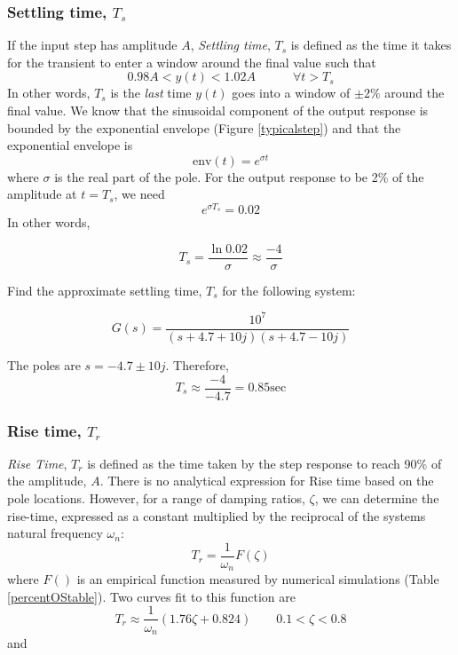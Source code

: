 \subsubsection{Settling time, $T_s$}
If the input step has amplitude $A$,
{\it Settling time}, $T_s$ is defined as the time it takes for the transient to enter a window around the final value such that
\[
0.98A < y(t) < 1.02A   \qquad\quad \forall t > T_s
\]
In other words, $T_s$ is the {\it last} time $y(t)$ goes into a window of $\pm2\%$ around the final value.
We know that the sinusoidal component of the output response is bounded by the exponential envelope (Figure \ref{typicalstep}) and that the exponential envelope is
\[
\mathrm{env}(t) = e^{\sigma t}
\]
where $\sigma$ is the real part of the pole.  For the output response to be 2\% of the amplitude at $t=T_s$, we need
\[
e^{\sigma T_s} = 0.02
\]
In other words,

\[
T_s = \frac{\ln{0.02}}{\sigma} \approx \frac{-4}{\sigma}
\]

\begin{ExampleSmall}
Find the approximate settling time, $T_s$ for the following system:

\[
G(s) = \frac {10^7}  {(s+4.7+10j)(s+4.7-10j)}
\]

\vspace{0.25in}
The poles are $s=-4.7\pm10j$.  Therefore,
\[
T_s \approx \frac{-4}{-4.7}  = 0.85 \mathrm{sec}
\]
\end{ExampleSmall}



\subsubsection{Rise time, $T_r$}
{\it Rise Time}, $T_r$ is defined as the time taken by the step response to reach 90\% of the amplitude, $A$.
There is no analytical expression for Rise time based on the pole locations.   However, for a range of damping ratios, $\zeta$,
we can determine the rise-time, expressed as a constant multiplied by the reciprocal of the systems natural frequency $\omega_n$:
\begin{equation}
T_r = \frac{1}{\omega_n}F(\zeta)
\end{equation}
where $F()$ is an empirical function measured by numerical simulations (Table \ref{percentOStable}).   Two curves fit to this function are
\begin{equation}
T_r \approx \frac{1}{\omega_n}(1.76\zeta + 0.824) \qquad   0.1< \zeta < 0.8
\end{equation}
and

